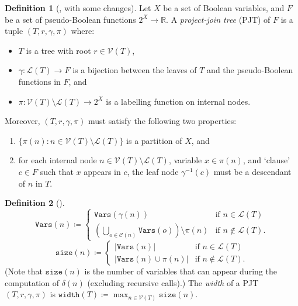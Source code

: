 \documentclass{article}
\theoremstyle{definition}
\newtheorem{definition}{Definition}
\theoremstyle{remark}
\begin{document}
\begin{definition}[\cite{DBLP:conf/cp/DudekPV20}, with some changes]
  Let $X$ be a set of Boolean variables, and $F$ be a set of pseudo-Boolean
  functions $2^X \to \mathbb{R}$. A \emph{project-join tree} (PJT) of $F$ is a
  tuple $(T, r, \gamma, \pi)$ where:
  \begin{itemize}
  \item $T$ is a tree with root $r \in \mathcal{V}(T)$,
  \item $\gamma\colon \mathcal{L}(T) \to F$ is a bijection between the leaves of
    $T$ and the pseudo-Boolean functions in $F$, and
  \item $\pi\colon \mathcal{V}(T) \setminus \mathcal{L}(T) \to 2^X$ is a
    labelling function on internal nodes.
  \end{itemize}
  Moreover, $(T, r, \gamma, \pi)$ must satisfy the following two properties:
  \begin{enumerate}
  \item $\{\pi(n) : n \in \mathcal{V}(T) \setminus \mathcal{L}(T)\}$ is a
    partition of $X$, and
  \item for each internal node $n \in \mathcal{V}(T) \setminus \mathcal{L}(T)$,
    variable $x \in \pi(n)$, and `clause' $c \in F$ such that $x$
    appears in $c$, the leaf node $\gamma^{-1}(c)$ must be a descendant of $n$
    in $T$.
  \end{enumerate}
\end{definition}

\begin{definition}[\cite{DBLP:conf/cp/DudekPV20}] \label{def:size}
  \[
    \mathtt{Vars}(n) \coloneqq
    \begin{cases}
      \mathtt{Vars}(\gamma(n)) & \text{if } n \in \mathcal{L}(T) \\
      \left( \bigcup_{o \in \mathcal{C}(n)} \mathtt{Vars}(o) \right) \setminus
      \pi(n) & \text{if } n \not\in \mathcal{L}(T).
    \end{cases}
  \]
  \[
    \mathtt{size}(n) \coloneqq
    \begin{cases}
      |\mathtt{Vars}(n)| & \text{if } n \in \mathcal{L}(T) \\
      |\mathtt{Vars}(n) \cup \pi(n)| & \text{if } n \not\in \mathcal{L}(T).
    \end{cases}
  \]
  (Note that $\mathtt{size}(n)$ is the number of variables that can appear
  during the computation of $\delta(n)$ (excluding recursive calls).)
  The \emph{width} of a PJT $(T, r, \gamma, \pi)$ is
  $\mathtt{width}(T) \coloneqq \max_{n \in \mathcal{V}(T)} \mathtt{size}(n)$.
\end{definition} %
\end{document}
